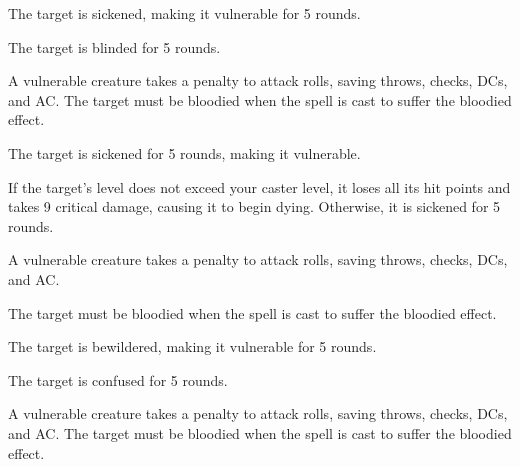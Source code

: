 \spellrng{\rngclose}
\begin{spellhealthy}
  The target is sickened, making it vulnerable for 5 rounds.
\end{spellhealthy}
\begin{spellblood}
  The target is blinded for 5 rounds.
\end{spellblood}
\begin{spellnotes}
  A vulnerable creature takes a  penalty to attack rolls, saving throws, checks, DCs, and AC.
  The target must be bloodied when the spell is cast to suffer the bloodied effect.
\end{spellnotes}

\spellrng{\rngclose}
\begin{spellhealthy}
  The target is sickened for 5 rounds, making it vulnerable.
\end{spellhealthy}
\begin{spellblood}
  If the target's level does not exceed your caster level, it loses all its hit points and takes 9 critical damage, causing it to begin dying. Otherwise, it is sickened for 5 rounds.
\end{spellblood}
\begin{spellnotes}
  A vulnerable creature takes a  penalty to attack rolls, saving throws, checks, DCs, and AC.

  The target must be bloodied when the spell is cast to suffer the bloodied effect.
\end{spellnotes}

\spellrng{\rngclose}
\begin{spellhealthy}
  The target is bewildered, making it vulnerable for 5 rounds.
\end{spellhealthy}
\begin{spellblood}
  The target is confused for 5 rounds. \confusionexplanation
\end{spellblood}
\begin{spellnotes}
  A vulnerable creature takes a  penalty to attack rolls, saving throws, checks, DCs, and AC.
  The target must be bloodied when the spell is cast to suffer the bloodied effect.
\end{spellnotes}

